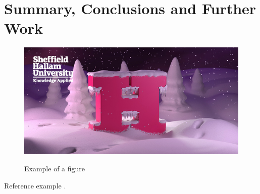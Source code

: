 \chapter{Summary, Conclusions and Further Work}

\begin{figure}[!htb]
    \caption{Example of a figure}
    \centering 
    \includegraphics[scale=0.5]{images/img.png}
    \label{figure:img}
\end{figure}


Reference example \cite{Abreu:2010}.